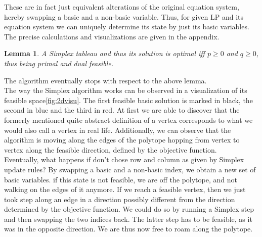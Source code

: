 \documentclass[a4paper, 11pt]{article}
\newtheorem{lemma}{Lemma}
\begin{document}
These are in fact just equivalent alterations of the original equation system, hereby swapping a basic and a non-basic variable. Thus, for given LP and its equation system we can uniquely determine its state by just its basic variables. The precise calculations and visualizations are given in the appendix.

\begin{lemma}
	A Simplex tableau and thus its solution is optimal iff $p\geq0$ and $q\geq0$, thus being primal and dual feasible.
\end{lemma}

The algorithm eventually stops with respect to the above lemma. \\

The way the Simplex algorithm works can be observed in a visualization of its feasible space\ref{fig:2dvisu}. The first feasible basic solution is marked in black, the second in blue and the third in red. At first we are able to discover that the formerly mentioned quite abstract definition of a vertex corresponds to what we would also call a vertex in real life. Additionally, we can observe that the algorithm is moving along the edges of the polytope hopping from vertex to vertex along the feasible direction, defined by the objective function. \\

Eventually, what happens if don't chose row and column as given by Simplex update rules? By swapping a basic and a non-basic index, we obtain a new set of basic variables. if this state is not feasible, we are off the polytope, and not walking on the edges of it anymore. If we reach a feasible vertex, then we just took step along an edge in a direction possibly different from the direction determined by the objective function. We could do so by running a Simplex step and then swapping the two indices back. The latter step has to be feasible, as it was in the opposite direction. We are thus now free to roam along the polytope.
\end{document}

